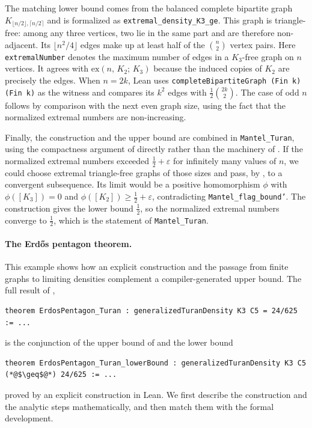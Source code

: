 \documentclass{article}
\newcommand{\lean}[1]{\texttt{#1}}
\begin{document}
The matching lower bound comes from the balanced complete bipartite graph
$K_{\lfloor n/2\rfloor,\lceil n/2\rceil}$ and is formalized as
\lean{extremal\_density\_K3\_ge}.  This graph is triangle-free:
among any three vertices, two lie in the same part and are therefore
non-adjacent.  Its $\lfloor n^2/4\rfloor$ edges make up at least half of the
$\binom{n}{2}$ vertex pairs.  Here \lean{extremalNumber} denotes the maximum
number of edges in a $K_3$-free graph on $n$ vertices.  It agrees with
$\mathrm{ex}(n,\,K_2;\,K_3)$ because the induced copies of $K_2$ are precisely
the edges.  When $n=2k$, Lean uses
\lean{completeBipartiteGraph (Fin k) (Fin k)} as the witness and compares its
$k^2$ edges with $\tfrac12\binom{2k}{2}$.  The case of odd $n$ follows by
comparison with the next even graph size, using the fact that the normalized
extremal numbers are non-increasing.

Finally, the construction and the upper bound are combined in
\lean{Mantel\_Turan}, using the compactness argument of
 directly rather than the machinery of
.  If the normalized extremal
numbers exceeded $\tfrac12+\varepsilon$ for infinitely many values of $n$, we
could choose extremal triangle-free graphs of those sizes and pass, by
, to a convergent subsequence.  Its limit would be a
positive homomorphism $\phi$ with $\phi([K_3])=0$ and
$\phi([K_2])\geq\tfrac12+\varepsilon$, contradicting
\lean{Mantel\_flag\_bound'}.  The construction gives the lower bound
$\tfrac12$, so the normalized extremal numbers converge to $\tfrac12$, which
is the statement of \lean{Mantel\_Turan}.

\paragraph{The Erd\H{o}s pentagon theorem.}
This example shows how an explicit construction and the passage from finite
graphs to limiting densities complement a compiler-generated upper bound.
The full result of ,
\begin{lstlisting}
theorem ErdosPentagon_Turan : generalizedTuranDensity K3 C5 = 24/625 := ...
\end{lstlisting}
is the conjunction of the upper bound of  and the lower
bound
\begin{lstlisting}
theorem ErdosPentagon_Turan_lowerBound : generalizedTuranDensity K3 C5 (*@$\geq$@*) 24/625 := ...
\end{lstlisting}
proved by an explicit construction in Lean.  We first describe the
construction and the analytic steps mathematically, and then match them with
the formal development.
\end{document}
